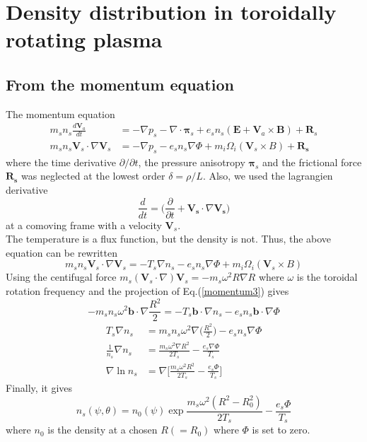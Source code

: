 \section{Density distribution in toroidally rotating plasma}
\subsection{From the momentum equation}
The momentum equation
\begin{equation}
\begin{split}
    m_s n_s \frac{d \bm{V}_a}{dt}&=-\nabla p_s- \nabla \cdot \bm{\pi}_s + e_sn_s(\bm{E}+\bm{V}_a \times \bm{B}) + \bm{R}_s \\
    m_s n_s \bm{V}_s \cdot \nabla \bm{V}_s &= -\nabla p_s -e_s n_s \nabla \Phi + m_i \Omega_i (\bm{V}_s \times B) + \bm{R_s}
\end{split}
\end{equation}
where the time derivative $\partial / \partial t$, the pressure anisotropy $\bm{\pi}_s$ and the frictional force $\bm{R_s}$ was neglected at the lowest order $\delta=\rho/L$. Also, we used the lagrangien derivative 
\begin{equation}
    \frac{d}{dt} = \Big( \frac{\partial}{\partial t} + \bm{V_s} \cdot \nabla \bm{V_s}\Big)
\end{equation}
at a comoving frame with a velocity $\bm{V}_s$. \\
The temperature is a flux function, but the density is not. Thus, the above equation can be rewritten 
\begin{equation}
    m_s n_s \bm{V}_s \cdot \nabla \bm{V}_s = -T_s\nabla n_s -e_s n_s \nabla \Phi + m_i \Omega_i (\bm{V}_s \times B)
\label{momentum3}
\end{equation}
Using the centifugal force $m_s(\bm{V}_s \cdot \nabla) \bm{V}_s = -m_s \omega^2R\nabla R$ where $\omega$ is the toroidal rotation frequency and the projection of Eq.(\ref{momentum3}) gives 
\begin{equation}
    -m_s n_s \omega^2 \bm{b} \cdot \nabla \frac{R^2}{2} = -T_s \bm{b} \cdot \nabla n_s -e_s n_s \bm{b} \cdot \nabla \Phi 
\end{equation}
\begin{equation}
\begin{split}
    T_s \nabla n_s &= m_s n_s \omega^2 \nabla \big( \frac{R^2}{2} \big) - e_s n_s  \nabla \Phi \\
    \frac{1}{n_s} \nabla n_s &= \frac{m_s \omega^2 \nabla R^2}{2T_s} - \frac{e_s\nabla \Phi}{T_s} \\
    \nabla{\ln{n_s}} &= \nabla \Bigg[ \frac{m_s \omega^2 R^2}{2T_s} - \frac{e_s \Phi}{T_s}\Bigg]
\end{split}
\end{equation}
Finally, it gives
\begin{equation}
    \boxed{n_s(\psi, \theta) = n_0(\psi)\exp{\frac{m_s \omega^2 (R^2-R_0^2)}{2T_s} - \frac{e_s \Phi}{T_s}}}
\end{equation}
where $n_0$ is the density at a chosen $R(=R_0)$ where $\Phi$ is set to zero.

